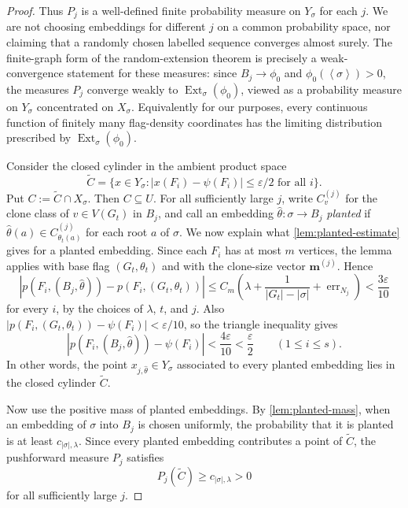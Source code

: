 \documentclass[11pt]{article}
\theoremstyle{definition}
\newcommand{\Ext}{\operatorname{Ext}}
\newcommand{\brak}[1]{\left\langle #1\right\rangle}
\newcommand{\eps}{\varepsilon}
\begin{document}
\begin{proof}
Thus $P_j$ is a well-defined finite probability measure on $Y_\sigma$ for each
$j$.  We are not choosing embeddings for different $j$ on a common probability
space, nor claiming that a randomly chosen labelled sequence converges almost
surely.  The finite-graph form of the random-extension theorem is precisely a
weak-convergence statement for these measures: since $B_j\to\phi_0$ and
$\phi_0(\brak\sigma)>0$, the measures $P_j$ converge weakly to
$\Ext_\sigma(\phi_0)$, viewed as a probability measure on $Y_\sigma$ concentrated
on $X_\sigma$.  Equivalently for our purposes, every continuous function of
finitely many flag-density coordinates has the limiting distribution prescribed
by $\Ext_\sigma(\phi_0)$.

Consider the closed cylinder in the ambient product space
\[
  \widetilde C=
  \{x\in Y_\sigma:
    |x(F_i)-\psi(F_i)|\le\eps/2\text{ for all }i\}.
\]
Put $C:=\widetilde C\cap X_\sigma$.  Then $C\subseteq U$.  For all sufficiently
large $j$, write $C_v^{(j)}$ for the clone class of $v\in V(G_t)$ in $B_j$, and
call an embedding $\widehat\theta:\sigma\to B_j$ \emph{planted} if
$\widehat\theta(a)\in C_{\theta_t(a)}^{(j)}$ for each root $a$ of
$\sigma$.  We now explain what \cref{lem:planted-estimate} gives for a planted
embedding.  Since each $F_i$ has at most $m$ vertices, the lemma applies with
base flag $(G_t,\theta_t)$ and with the clone-size vector
$\mathbf m^{(j)}$.  Hence
\[
  |p(F_i,(B_j,\widehat\theta))-p(F_i,(G_t,\theta_t))|
  \le
  C_m\left(\lambda+\frac1{|G_t|-|\sigma|}+\operatorname{err}_{N_j}\right)
  <\frac{3\eps}{10}
\]
for every $i$, by the choices of $\lambda$, $t$, and $j$.  Also
$|p(F_i,(G_t,\theta_t))-\psi(F_i)|<\eps/10$, so the triangle inequality gives
\[
  |p(F_i,(B_j,\widehat\theta))-\psi(F_i)|<\frac{4\eps}{10}<\frac{\eps}{2}
  \qquad(1\le i\le s).
\]
In other words, the point $x_{j,\widehat\theta}\in Y_\sigma$ associated to every
planted embedding lies in the closed cylinder $\widetilde C$.

Now use the positive mass of planted embeddings.  By \cref{lem:planted-mass},
when an embedding of $\sigma$ into $B_j$ is chosen uniformly, the
probability that it is planted is at least $c_{|\sigma|,\lambda}$.  Since every
planted embedding contributes a point of $\widetilde C$, the pushforward measure
$P_j$ satisfies
\[
  P_j(\widetilde C)\ge c_{|\sigma|,\lambda}>0
\]
for all sufficiently large $j$.


\end{proof}
\end{document}
